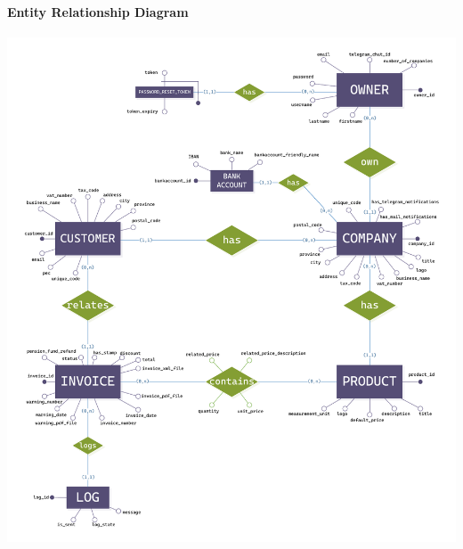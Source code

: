 \paragraph[]{Entity Relationship Diagram} \hspace{1cm} \par
\includegraphics[width=\textwidth, keepaspectratio]{resources/ERSchema.pdf}
\vspace{8mm}



